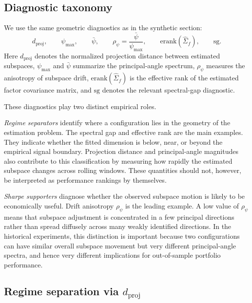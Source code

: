 \documentclass[11pt,letterpaper]{article}
\newcommand{\dproj}{d_{\mathrm{proj}}}
\newcommand{\erank}{\mathrm{erank}}
\begin{document}
\subsection{Diagnostic taxonomy}
\label{sec:hist:taxonomy}

We use the same geometric diagnostics as in the synthetic section:
\begin{equation*}
	\dproj,\qquad
	\psi_{\max},\qquad
	\bar\psi,\qquad
	\rho_\psi=\frac{\bar\psi}{\psi_{\max}},
	\qquad
	\erank(\hat{\Sigma}_f),
	\qquad
	\mathrm{sg}.
\end{equation*}
Here $\dproj$ denotes the normalized projection distance between estimated
subspaces, $\psi_{\max}$ and $\bar\psi$ summarize the principal-angle
spectrum, $\rho_\psi$ measures the anisotropy of subspace drift,
$\erank(\hat{\Sigma}_f)$ is the effective rank of the estimated factor
covariance matrix, and $\mathrm{sg}$ denotes the relevant spectral-gap
diagnostic.

These diagnostics play two distinct empirical roles.

\emph{Regime separators} identify where a configuration lies in the geometry of
the estimation problem. The spectral gap and effective rank are the main
examples. They indicate whether the fitted dimension is below, near, or beyond
the empirical signal boundary. Projection distance and principal-angle
magnitudes also contribute to this classification by measuring how rapidly the
estimated subspace changes across rolling windows. These quantities should not,
however, be interpreted as performance rankings by themselves.

\emph{Sharpe supporters} diagnose whether the observed subspace motion is likely
to be economically useful. Drift anisotropy $\rho_\psi$ is the leading
example. A low value of $\rho_\psi$ means that subspace adjustment is
concentrated in a few principal directions rather than spread diffusely across
many weakly identified directions. In the historical experiments, this
distinction is important because two configurations can have similar overall
subspace movement but very different principal-angle spectra, and hence very
different implications for out-of-sample portfolio performance.

\subsection{Regime separation via \texorpdfstring{$d_{\mathrm{proj}}$}{d\_proj}}
\label{sec:regime}
\end{document}
